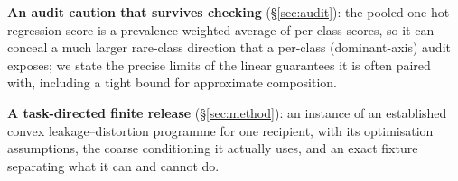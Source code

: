 \item \textbf{An audit caution that survives checking} (\S\ref{sec:audit}): the pooled one-hot
regression score is a prevalence-weighted average of per-class scores, so it can conceal a much larger
rare-class direction that a per-class (dominant-axis) audit exposes; we state the precise limits of the
linear guarantees it is often paired with, including a tight bound for approximate composition.

\item \textbf{A task-directed finite release} (\S\ref{sec:method}): an instance of an established
convex leakage--distortion programme for one recipient, with its optimisation assumptions, the coarse
conditioning it actually uses, and an exact fixture separating what it can and cannot do.
